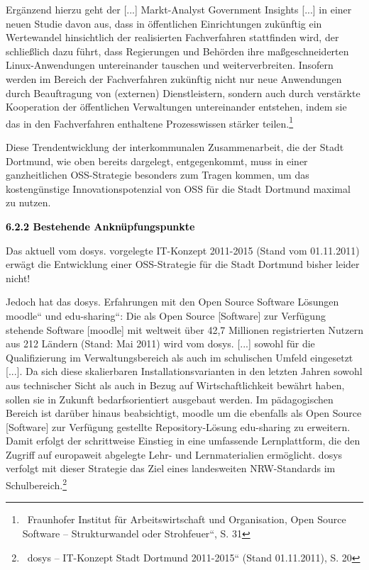 \documentclass[a4paper]{article}
\begin{document}
\bigskip

{
Erg\"anzend hierzu geht der {\guillemotright} [...] Markt-Analyst
Government Insights [...] in einer neuen Studie davon aus, dass in
\"offentlichen Einrichtungen zuk\"unftig ein Wertewandel hinsichtlich
der realisierten Fachverfahren stattfinden wird, der schlie{\ss}lich
dazu f\"uhrt, dass Regierungen und Beh\"orden ihre
ma{\ss}geschneiderten Linux-Anwendungen untereinander tauschen und
weiterverbreiten. Insofern werden im Bereich der Fachverfahren
zuk\"unftig nicht nur neue Anwendungen durch Beauftragung von
(externen) Dienstleistern, sondern auch durch verst\"arkte Kooperation
der \"offentlichen Verwaltungen untereinander entstehen, indem sie das
in den Fachverfahren enthaltene Prozesswissen st\"arker
teilen.{\guillemotleft}\footnote{\ Fraunhofer Institut f\"ur
Arbeitswirtschaft und Organisation, {\quotedblbase}Open Source Software
-- Strukturwandel oder Strohfeuer{\textquotedblleft}, S. 31}}

{
Diese Trendentwicklung der interkommunalen Zusammenarbeit, die der Stadt
Dortmund, wie oben bereits dargelegt, entgegenkommt, muss in einer
ganzheitlichen OSS-Strategie besonders zum Tragen kommen, um das
kosteng\"unstige Innovationspotenzial von OSS f\"ur die Stadt Dortmund
maximal zu nutzen.}


\bigskip


\bigskip

{
\hypertarget{BestehendeAnknpfungspunkte}{}\textbf{\textcolor{black}{6.2.2}}\textbf{\textcolor{black}{
}}\textbf{\textcolor{black}{Bestehende}}\textbf{\textcolor{black}{
}}\textbf{\textcolor{black}{Ankn\"upfungspunkte}}}


\bigskip

{
Das aktuell vom dosys. vorgelegte IT-Konzept 2011-2015 (Stand vom
01.11.2011) erw\"agt die Entwicklung einer OSS-Strategie f\"ur die
Stadt Dortmund bisher leider nicht!}

{
Jedoch hat das dosys. Erfahrungen mit den Open Source Software
L\"osungen {\quotedblbase}moodle{\textquotedblleft} und
{\quotedblbase}edu-sharing{\textquotedblleft}: {\guillemotright}Die als
Open Source [Software] zur Verf\"ugung stehende Software [moodle] mit
weltweit \"uber 42,7 Millionen registrierten Nutzern aus 212 L\"andern
(Stand: Mai 2011) wird vom dosys. [...] sowohl f\"ur die Qualifizierung
im Verwaltungsbereich als auch im schulischen Umfeld eingesetzt [...].
Da sich diese skalierbaren Installationsvarianten in den letzten Jahren
sowohl aus technischer Sicht als auch in Bezug auf Wirtschaftlichkeit
bew\"ahrt haben, sollen sie in Zukunft bedarfsorientiert ausgebaut
werden. Im p\"adagogischen Bereich ist dar\"uber hinaus beabsichtigt,
moodle um die ebenfalls als Open Source [Software] zur Verf\"ugung
gestellte Repository-L\"osung edu-sharing zu erweitern. Damit erfolgt
der schrittweise Einstieg in eine umfassende Lernplattform, die den
Zugriff auf europaweit abgelegte Lehr- und Lernmaterialien
erm\"oglicht. dosys verfolgt mit dieser Strategie das Ziel eines
landesweiten NRW-Standards im
Schulbereich.{\guillemotleft}\footnote{\ dosys --
{\quotedblbase}IT-Konzept Stadt Dortmund 2011-2015{\textquotedblleft}
(Stand 01.11.2011), S. 20}}
\end{document}
